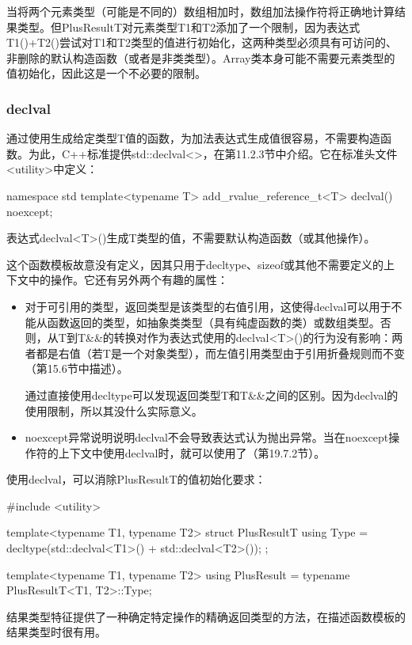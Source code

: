 当将两个元素类型（可能是不同的）数组相加时，数组加法操作符将正确地计算结果类型。但PlusResultT对元素类型T1和T2添加了一个限制，因为表达式T1()+T2()尝试对T1和T2类型的值进行初始化，这两种类型必须具有可访问的、非删除的默认构造函数（或者是非类类型）。Array类本身可能不需要元素类型的值初始化，因此这是一个不必要的限制。

\subsubsection{declval}

通过使用生成给定类型T值的函数，为加法表达式生成值很容易，不需要构造函数。为此，C++标准提供std::declval<>，在第11.2.3节中介绍。它在标准头文件<utility>中定义：

\begin{cpp}
namespace std {
	template<typename T>
	add_rvalue_reference_t<T> declval() noexcept;
}
\end{cpp}

表达式declval<T>()生成T类型的值，不需要默认构造函数（或其他操作）。

这个函数模板故意没有定义，因其只用于decltype、sizeof或其他不需要定义的上下文中的操作。它还有另外两个有趣的属性：

\begin{itemize}
\item 
对于可引用的类型，返回类型是该类型的右值引用，这使得declval可以用于不能从函数返回的类型，如抽象类类型（具有纯虚函数的类）或数组类型。否则，从T到T\&\&的转换对作为表达式使用的declval<T>()的行为没有影响：两者都是右值（若T是一个对象类型），而左值引用类型由于引用折叠规则而不变（第15.6节中描述）。

\begin{notice}
通过直接使用decltype可以发现返回类型T和T\&\&之间的区别。因为declval的使用限制，所以其没什么实际意义。
\end{notice}

\item 
noexcept异常说明说明declval不会导致表达式认为抛出异常。当在noexcept操作符的上下文中使用declval时，就可以使用了（第19.7.2节）。
\end{itemize}

使用declval，可以消除PlusResultT的值初始化要求：

\begin{cpp}
#include <utility>

template<typename T1, typename T2>
struct PlusResultT {
	using Type = decltype(std::declval<T1>() + std::declval<T2>());
};

template<typename T1, typename T2>
using PlusResult = typename PlusResultT<T1, T2>::Type;
\end{cpp}

结果类型特征提供了一种确定特定操作的精确返回类型的方法，在描述函数模板的结果类型时很有用。




















